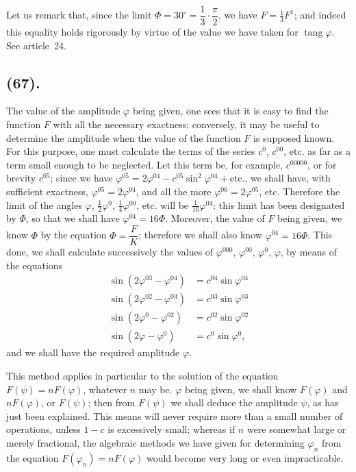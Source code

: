 \documentclass{article}
\begin{document}
Let us remark that, since the limit $\Phi=30^{\circ}=\dfrac{1}{3}\cdot\dfrac{\pi}{2}$, we have $F=\frac{1}{3}F^{1}$; and indeed this equality holds rigorously by virtue of the value we have taken for $\operatorname{tang}\varphi$. See article~24.

\subsection*{(67).}

The value of the amplitude $\varphi$ being given, one sees that it is easy to find the function $F$ with all the necessary exactness; conversely, it may be useful to determine the amplitude when the value of the function $F$ is supposed known. For this purpose, one must calculate the terms of the series $c^{0}$, $c^{00}$, etc. as far as a term small enough to be neglected. Let this term be, for example, $c^{00000}$, or for brevity $c^{05}$; since we have $\varphi^{05}=2\varphi^{04}-c^{05}\sin^{2}\varphi^{04}+\text{etc.}$, we shall have, with sufficient exactness, $\varphi^{05}=2\varphi^{04}$, and all the more $\varphi^{06}=2\varphi^{05}$, etc. Therefore the limit of the angles $\varphi$, $\frac{1}{2}\varphi^{0}$, $\frac{1}{4}\varphi^{00}$, etc. will be $\frac{1}{16}\varphi^{04}$: this limit has been designated by $\Phi$, so that we shall have $\varphi^{04}=16\Phi$. Moreover, the value of $F$ being given, we know $\Phi$ by the equation $\Phi=\dfrac{F}{K}$; therefore we shall also know $\varphi^{04}=16\Phi$. This done, we shall calculate successively the values of $\varphi^{000}$, $\varphi^{00}$, $\varphi^{0}$, $\varphi$, by means of the equations
\[ \begin{aligned} \sin(2\varphi^{03}-\varphi^{04})&=c^{04}\sin\varphi^{04}\\ \sin(2\varphi^{02}-\varphi^{03})&=c^{03}\sin\varphi^{03}\\ \sin(2\varphi^{0}-\varphi^{02})&=c^{02}\sin\varphi^{02}\\ \sin(2\varphi-\varphi^{0})&=c^{0}\sin\varphi^{0}, \end{aligned} \]
and we shall have the required amplitude $\varphi$.

This method applies in particular to the solution of the equation $F(\psi)=nF(\varphi)$, whatever $n$ may be. $\varphi$ being given, we shall know $F(\varphi)$ and $nF(\varphi)$, or $F(\psi)$; then from $F(\psi)$ we shall deduce the amplitude $\psi$, as has just been explained. This means will never require more than a small number of operations, unless $1-c$ is excessively small; whereas if $n$ were somewhat large or merely fractional, the algebraic methods we have given for determining $\varphi_{n}$ from the equation $F(\varphi_{n})=nF(\varphi)$ would become very long or even impracticable.
\end{document}
